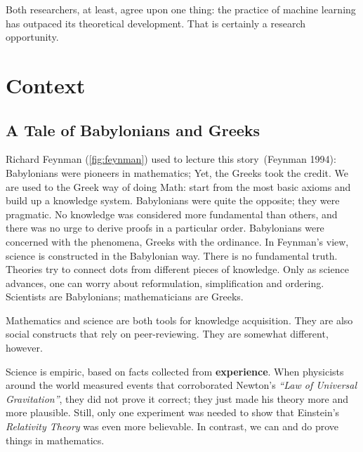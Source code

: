 \documentclass[
  letterpaper,
  a4paper,
  12pt,
  twoside,
  brazil,
  british,
  open=right]{scrbook}
\begin{document}
Both researchers, at least, agree upon one thing: the practice of
machine learning has outpaced its theoretical development. That is
certainly a research opportunity.

\hypertarget{sec:context}{%
\section{Context}\label{sec:context}}

\hypertarget{sec:greeks}{%
\subsection{A Tale of Babylonians and Greeks}\label{sec:greeks}}

Richard Feynman (\protect\hyperlink{fig:feynman}{{[}fig:feynman{]}})
used to lecture this story~(Feynman
1994):
Babylonians were pioneers in mathematics; Yet, the Greeks took the
credit. We are used to the Greek way of doing Math: start from the most
basic axioms and build up a knowledge system. Babylonians were quite the
opposite; they were pragmatic. No knowledge was considered more
fundamental than others, and there was no urge to derive proofs in a
particular order. Babylonians were concerned with the phenomena, Greeks
with the ordinance. In Feynman's view, science is constructed in the
Babylonian way. There is no fundamental truth. Theories try to connect
dots from different pieces of knowledge. Only as science advances, one
can worry about reformulation, simplification and ordering. Scientists
are Babylonians; mathematicians are Greeks.

Mathematics and science are both tools for knowledge acquisition. They
are also social constructs that rely on peer-reviewing. They are
somewhat different, however.

Science is empiric, based on facts collected from \textbf{experience}.
When physicists around the world measured events that corroborated
Newton's \emph{``Law of Universal Gravitation''}, they did not prove it
correct; they just made his theory more and more plausible. Still, only
one experiment was needed to show that Einstein's \emph{Relativity
Theory} was even more believable. In contrast, we can and do prove
things in mathematics.
\end{document}
